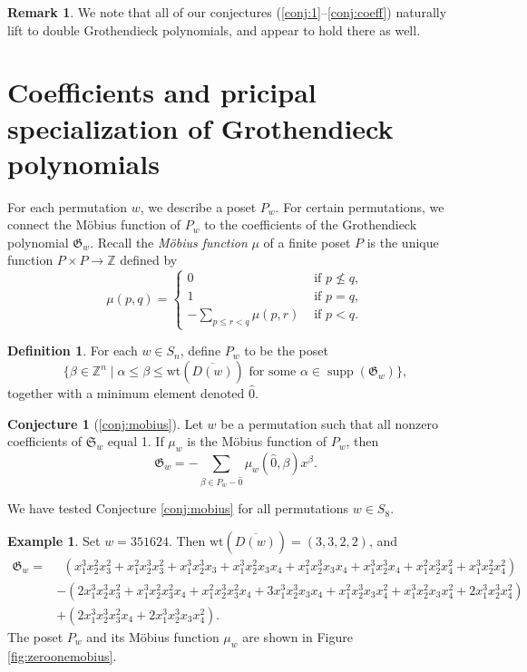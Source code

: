 \documentclass{amsart}
\theoremstyle{definition}
\newtheorem{definition}[theorem]{Definition}
\newtheorem{example}[theorem]{Example}
\newtheorem{remark}[theorem]{Remark}
\theoremstyle{named}
\newtheorem*{namedconjecture}{Conjecture}
\DeclareMathOperator{\supp}{supp}
\begin{document}
	\begin{remark} 
		We note that all of our conjectures (\ref{conj:1}--\ref{conj:coeff}) naturally lift to double Grothendieck polynomials, and appear to hold there as well.	
	\end{remark}
	
	
	\section{Coefficients and pricipal specialization of Grothendieck polynomials}
	\label{sec:mobius}
	For each permutation $w$, we describe a poset $P_w$. For certain permutations, we connect the M\"obius function of $P_w$ to the coefficients of the Grothendieck polynomial $\mathfrak{G}_w$. Recall the \emph{M\"obius function} $\mu$ of a finite poset $P$ is the unique function $P\times P\to \mathbb{Z}$ defined by 
	\[\mu(p,q) = \begin{cases}
		0 &\mbox{ if } p\nleq q,\\
		1 &\mbox{ if } p=q,\\
		-\displaystyle\sum_{p\leq r<q}\mu(p,r)&\mbox{ if }p<q.
	\end{cases} \]
	\begin{definition}
		\label{def:poset}
		For each $w\in S_n$, define $P_w$ to be the poset 
		\[\{\beta\in\mathbb{Z}^n \mid \alpha \leq \beta \leq \mathrm{wt}(\overline{D(w)}) \mbox{ for some } \alpha\in \supp(\mathfrak{G}_w)\},\]
		together with a minimum element denoted $\hat{0}$.
	\end{definition}
	
	\begin{namedconjecture}[\ref{conj:mobius}]
		Let $w$ be a permutation such that all nonzero coefficients of $\mathfrak{S}_w$ equal 1. If $\mu_{w}$ is the M\"obius function of $P_w$, then
		\[\mathfrak{G}_w=-\sum_{\beta\in P_w-\hat{0}}\mu_w(\hat{0}, \beta)x^{\beta}.\]
	\end{namedconjecture}
	We have tested Conjecture \ref{conj:mobius} for all permutations $w\in S_8$.

	\begin{example}
		Set $w=351624$. Then $\mathrm{wt}(\overline{D(w)}) = (3,3,2,2)$, and 
		\begin{align*}
		\mathfrak{G}_w = &\phantom{a}
		(x_1^3x_2^2 x_3^2 
		+x_1^2x_2^3 x_3^2 
		+x_1^3x_2^3 x_3 
		+x_1^3x_2^2 x_3 x_4 
		+x_1^2x_2^3 x_3 x_4
		+x_1^3x_2^3 x_4 
		+x_1^2x_2^3 x_4^2 
		+x_1^3x_2^2 x_4^2 
		)\\
		&-(2 x_1^3x_2^3 x_3^2 
		+x_1^3x_2^2 x_3^2 x_4 
		+x_1^2x_2^3 x_3^2 x_4
		+3 x_1^3x_2^3 x_3 x_4
		+x_1^2x_2^3 x_3 x_4^2
		+x_1^3x_2^2 x_3 x_4^2
		+2 x_1^3x_2^3 x_4^2
		)\\
		&+(2 x_1^3x_2^3 x_3^2 x_4
		+2 x_1^3x_2^3 x_3 x_4^2 
		).
		\end{align*}
		The poset $P_w$ and its M\"obius function $\mu_{w}$ are shown in Figure \ref{fig:zeroonemobius}.
	\end{example}
	
\end{document}
